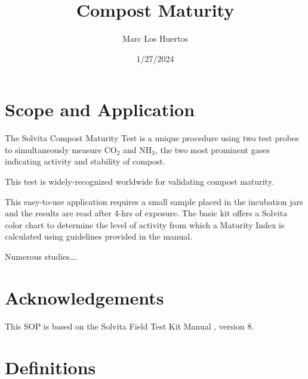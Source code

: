 \documentclass[12pt]{../SOP4_alpha}\usepackage[]{graphicx}\usepackage[]{xcolor}
\title{Compost Maturity}
\date{1/27/2024}
\author{Marc Los Huertos}
\begin{document}

\maketitle

\section{Scope and Application}

\NP The Solvita Compost Maturity Test is a unique procedure using two test probes to simultaneously measure CO$_2$ and NH$_3$, the two most prominent gases indicating activity and stability of compost.

\NP This test is widely-recognized worldwide for validating compost maturity.

\NP This easy-to-use application requires a small sample placed in the incubation jars and the results are read after 4-hrs of exposure.  The basic kit offers a Solvita color chart to determine the level of activity from which a Maturity Index is calculated using guidelines provided in the manual.

\NP 

\NP Numerous studies\ldots \citep{vargas2005assessing}.

\section{Acknowledgements}

\NP This SOP is based on the Solvita Field Test Kit Manual \citep{solvita2014}, version 8.

\section{Definitions}
\end{document}
